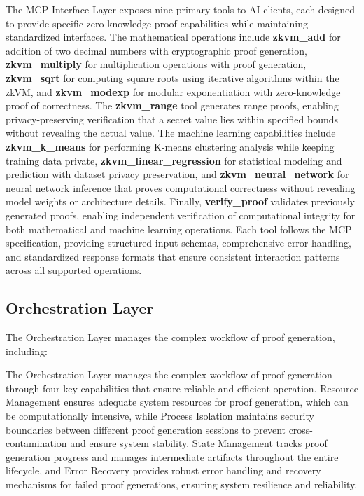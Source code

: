 \documentclass[11pt]{article}
\begin{document}
The MCP Interface Layer exposes nine primary tools to AI clients, each designed to provide specific zero-knowledge proof capabilities while maintaining standardized interfaces. The mathematical operations include \textbf{zkvm\_add} for addition of two decimal numbers with cryptographic proof generation, \textbf{zkvm\_multiply} for multiplication operations with proof generation, \textbf{zkvm\_sqrt} for computing square roots using iterative algorithms within the zkVM, and \textbf{zkvm\_modexp} for modular exponentiation with zero-knowledge proof of correctness. The \textbf{zkvm\_range} tool generates range proofs, enabling privacy-preserving verification that a secret value lies within specified bounds without revealing the actual value. The machine learning capabilities include \textbf{zkvm\_k\_means} for performing K-means clustering analysis while keeping training data private, \textbf{zkvm\_linear\_regression} for statistical modeling and prediction with dataset privacy preservation, and \textbf{zkvm\_neural\_network} for neural network inference that proves computational correctness without revealing model weights or architecture details. Finally, \textbf{verify\_proof} validates previously generated proofs, enabling independent verification of computational integrity for both mathematical and machine learning operations. Each tool follows the MCP specification, providing structured input schemas, comprehensive error handling, and standardized response formats that ensure consistent interaction patterns across all supported operations.

\subsection{Orchestration Layer}

The Orchestration Layer manages the complex workflow of proof generation, including:

The Orchestration Layer manages the complex workflow of proof generation through four key capabilities that ensure reliable and efficient operation. Resource Management ensures adequate system resources for proof generation, which can be computationally intensive, while Process Isolation maintains security boundaries between different proof generation sessions to prevent cross-contamination and ensure system stability. State Management tracks proof generation progress and manages intermediate artifacts throughout the entire lifecycle, and Error Recovery provides robust error handling and recovery mechanisms for failed proof generations, ensuring system resilience and reliability.
\end{document}
